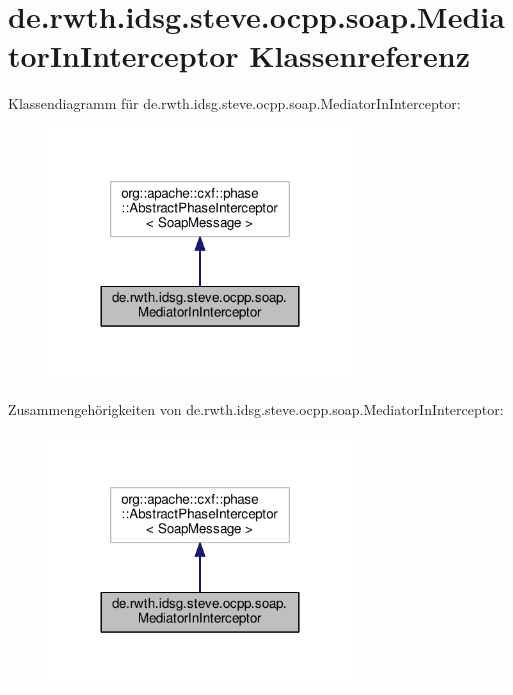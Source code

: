 \hypertarget{classde_1_1rwth_1_1idsg_1_1steve_1_1ocpp_1_1soap_1_1_mediator_in_interceptor}{\section{de.\-rwth.\-idsg.\-steve.\-ocpp.\-soap.\-Mediator\-In\-Interceptor Klassenreferenz}
\label{classde_1_1rwth_1_1idsg_1_1steve_1_1ocpp_1_1soap_1_1_mediator_in_interceptor}
}


Klassendiagramm für de.\-rwth.\-idsg.\-steve.\-ocpp.\-soap.\-Mediator\-In\-Interceptor\-:\nopagebreak
\begin{figure}[H]
\begin{center}
\leavevmode
\includegraphics[width=228pt]{classde_1_1rwth_1_1idsg_1_1steve_1_1ocpp_1_1soap_1_1_mediator_in_interceptor__inherit__graph}
\end{center}
\end{figure}


Zusammengehörigkeiten von de.\-rwth.\-idsg.\-steve.\-ocpp.\-soap.\-Mediator\-In\-Interceptor\-:\nopagebreak
\begin{figure}[H]
\begin{center}
\leavevmode
\includegraphics[width=228pt]{classde_1_1rwth_1_1idsg_1_1steve_1_1ocpp_1_1soap_1_1_mediator_in_interceptor__coll__graph}
\end{center}
\end{figure}

